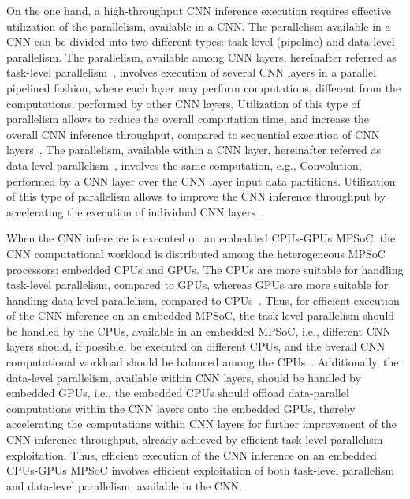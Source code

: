 On the one hand, a high-throughput CNN inference execution requires effective utilization of the parallelism, available in a CNN. The parallelism available in a CNN can be divided into two different types: task-level (pipeline) and data-level parallelism. The parallelism, available among CNN layers, hereinafter referred as task-level parallelism~\cite{ReindersParallelism}, involves execution of several CNN layers in a parallel pipelined fashion, where each layer may perform computations, different from the computations,
performed by other CNN layers. Utilization of this type of parallelism allows to reduce the overall computation time, and increase the overall  CNN inference throughput, compared to  sequential execution of CNN layers~\cite{Wang2019HighThroughputCI}. The parallelism, available within a CNN layer, hereinafter referred as data-level parallelism~\cite{ReindersParallelism}, involves the same computation, e.g., Convolution, performed by a CNN layer over the CNN layer input data partitions. Utilization of this type of parallelism allows to improve the CNN inference throughput by accelerating the execution of  individual CNN layers~\cite{tensorflow2015, Caffe2, DLSurvey17, HyPar19,  Tensorrt}. 

When the CNN inference is executed on an embedded CPUs-GPUs MPSoC, the CNN computational workload is distributed among the heterogeneous MPSoC processors: embedded CPUs and GPUs. The CPUs are more suitable for handling task-level parallelism, compared to GPUs, whereas  GPUs are more suitable for handling data-level parallelism, compared to CPUs~\cite{Singh2017}. Thus, for efficient execution of the CNN inference on an embedded MPSoC, the task-level parallelism should be handled by the CPUs, available in an embedded MPSoC, i.e.,  different  CNN layers should, if possible, be executed on different CPUs, and the overall CNN computational workload should be balanced among the CPUs~\cite{PerfBottleneck13}. 
Additionally, the data-level parallelism, available within CNN layers, should be handled by embedded GPUs, i.e., the embedded CPUs should  offload data-parallel computations within the CNN layers onto the embedded GPUs, thereby accelerating the computations within CNN layers for further improvement of the CNN inference throughput, already achieved by efficient task-level parallelism exploitation. Thus, efficient execution of the CNN inference on an embedded CPUs-GPUs MPSoC involves efficient  exploitation of both task-level parallelism and data-level parallelism, available in the CNN. 

